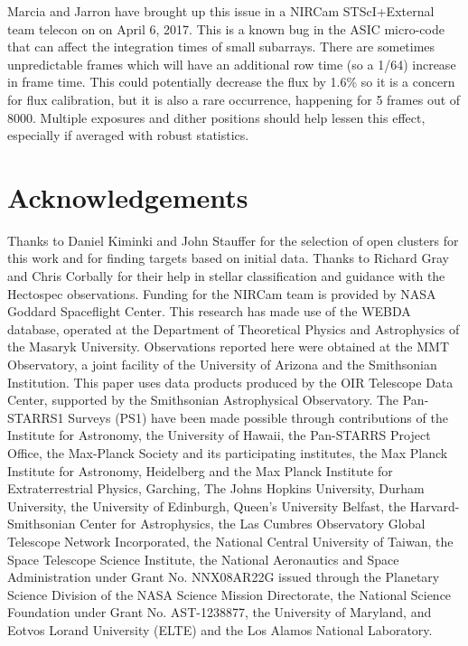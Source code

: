 \documentclass{aastex6}
\begin{document}
Marcia and Jarron have brought up this issue in a NIRCam STScI+External team telecon on on April 6, 2017.
This is a known bug in the ASIC micro-code that can affect the integration times of small subarrays.
There are sometimes unpredictable frames which will have an additional row time (so a 1/64) increase in frame time.
This could potentially decrease the flux by 1.6\% so it is a concern for flux calibration, but it is also a rare occurrence, happening for 5 frames out of 8000.
Multiple exposures and dither positions should help lessen this effect, especially if averaged with robust statistics.

\section*{Acknowledgements}

Thanks to Daniel Kiminki and John Stauffer for the selection of open clusters for this work and for finding targets based on initial data.
Thanks to Richard Gray and Chris Corbally for their help in stellar classification and guidance with the Hectospec observations.
Funding for the NIRCam team is provided by NASA Goddard Spaceflight Center. This research has made use of the WEBDA database, operated at the Department of Theoretical Physics and Astrophysics of the Masaryk University.
Observations reported here were obtained at the MMT Observatory, a joint facility of the University of Arizona and the Smithsonian Institution.
This paper uses data products produced by the OIR Telescope Data Center, supported by the Smithsonian Astrophysical Observatory.
The Pan-STARRS1 Surveys (PS1) have been made possible through contributions of the Institute for Astronomy, the University of Hawaii, the Pan-STARRS Project Office, the Max-Planck Society and its participating institutes, the Max Planck Institute for Astronomy, Heidelberg and the Max Planck Institute for Extraterrestrial Physics, Garching, The Johns Hopkins University, Durham University, the University of Edinburgh, Queen's University Belfast, the Harvard-Smithsonian Center for Astrophysics, the Las Cumbres Observatory Global Telescope Network Incorporated, the National Central University of Taiwan, the Space Telescope Science Institute, the National Aeronautics and Space Administration under Grant No. NNX08AR22G issued through the Planetary Science Division of the NASA Science Mission Directorate, the National Science Foundation under Grant No. AST-1238877, the University of Maryland, and Eotvos Lorand University (ELTE) and the Los Alamos National Laboratory. 
\end{document}
